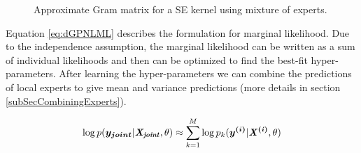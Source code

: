 \begin{figure}[!ht]
  \centering
  \quad
  \caption{Approximate Gram matrix for a SE kernel using mixture of experts.}
  \label{figDGPMTGP}
\end{figure}

Equation \ref{eq:dGPNLML} describes the formulation for marginal likelihood. Due to the independence assumption, the marginal likelihood can be written as a sum of individual likelihoods and then can be optimized to find the best-fit hyper-parameters. After learning the hyper-parameters we can combine the predictions of local experts to give mean and variance predictions (more details in section \ref{subSecCombiningExperts}). 

\begin{align}\label{eq:dGPNLML}
    \log p(\boldsymbol{y_{joint}}| \bm{\mathit{X_{joint}}}, \theta) \approx \sum_{k=1}^{M} \log p_{k}(\boldsymbol{y^{(i)}}| \bm{\mathit{X^{(i)}}}, \theta)
 \end{align}

